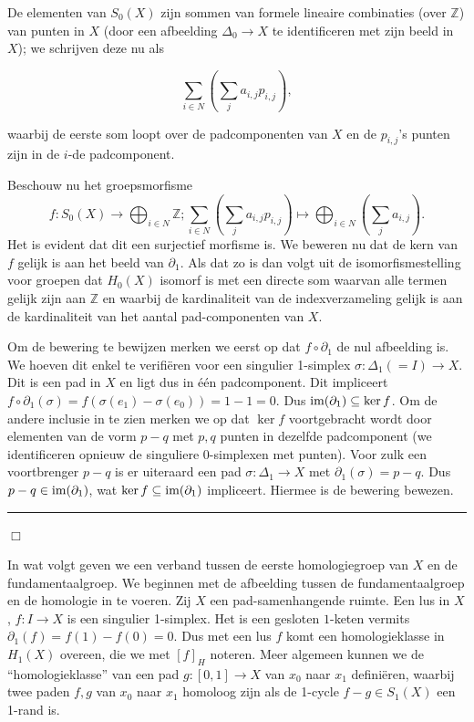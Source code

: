 \documentclass[12pt]{book}
\newcommand{\B}{\rule{1mm}{0mm} \hfill $\Box$ }
\begin{document}
De elementen van $S_{0}(X)$ zijn
sommen van formele lineaire combinaties (over $\mathbb{Z}$) van punten in $X$ (door een afbeelding
$\Delta_{0}\to X$ te identificeren met zijn beeld in $X$); we schrijven deze nu als 

$$\sum_{i\in
N}(\sum_{j}a_{i,j}p_{i,j}),$$ 


waarbij de eerste som loopt over de padcomponenten van $X$ en de
$p_{i,j}$'s punten zijn in de $i$-de padcomponent.

Beschouw nu het groepsmorfisme 
$$f:S_{0}(X)\to \bigoplus_{i\in N}\mathbb{Z};
\sum_{i\in N}(\sum_{j}a_{i,j}p_{i,j})\mapsto \bigoplus_{i\in N} (\sum_{j}a_{i,j}).$$ Het is evident dat dit een
surjectief morfisme is.  We beweren nu dat de kern van $f$ gelijk is aan het beeld van
$\partial_{1}$. Als dat zo is dan volgt uit de isomorfismestelling voor groepen dat $H_{0}(X)$
isomorf is met een directe som waarvan alle termen gelijk zijn aan $\mathbb{Z}$ en waarbij de kardinaliteit van de
indexverzameling gelijk is aan de kardinaliteit van het aantal pad-componenten van $X$.

Om de bewering te bewijzen merken we eerst op dat $f\circ \partial_{1}$ de nul afbeelding is. We
hoeven dit enkel te verifi\"eren voor een singulier 1-simplex $\sigma: \Delta_{1}(=I)\to X$. Dit is een pad in
$X$ en ligt dus in \'e\'en padcomponent. Dit impliceert
$f\circ \partial_{1}(\sigma)=f(\sigma(e_{1})-\sigma(e_{0}))=1-1=0.$ Dus $\mbox{{\rm
im}}(\partial_{1})\subseteq \ker f$. 
Om de andere inclusie in  te zien merken we op dat
$\ker f$ voortgebracht wordt door elementen van de vorm $p-q$ met
$p,q$ punten in dezelfde padcomponent (we identificeren opnieuw de singuliere $0$-simplexen met punten). 
Voor zulk een voortbrenger $p-q$ is er uiteraard een pad $\sigma:\Delta_{1}\to X$ met
$\partial_{1}(\sigma)=p-q$. Dus $p-q\in \mbox{{\rm im}}(\partial_{1})$, wat $\ker f\subseteq \mbox{{\rm im}}(\partial_{1})$ impliceert. Hiermee is de bewering bewezen. \B

In wat volgt geven we een verband tussen de eerste homologiegroep van $X$ en de fundamentaalgroep. We beginnen met de afbeelding tussen de fundamentaalgroep en de homologie in te voeren. 
Zij $X$ een pad-samenhangende ruimte. Een lus in $X$, $f:I\to X$ is  een singulier 1-simplex. Het is een gesloten 
$1$-keten vermits $\partial_1(f)=f(1)-f(0)=0$. Dus met een lus $f$ komt een homologieklasse in $H_1(X)$ overeen, die we met $[f]_{H}$ noteren. Meer algemeen kunnen we de ``homologieklasse'' van een pad $g:[0,1]\to X$ van $x_0$ naar $x_1$ defini\"eren, waarbij twee paden $f,g$ van $x_0$ naar $x_1$ homoloog zijn als de 1-cycle $f-g\in S_1(X)$ een 1-rand is.
\end{document}
